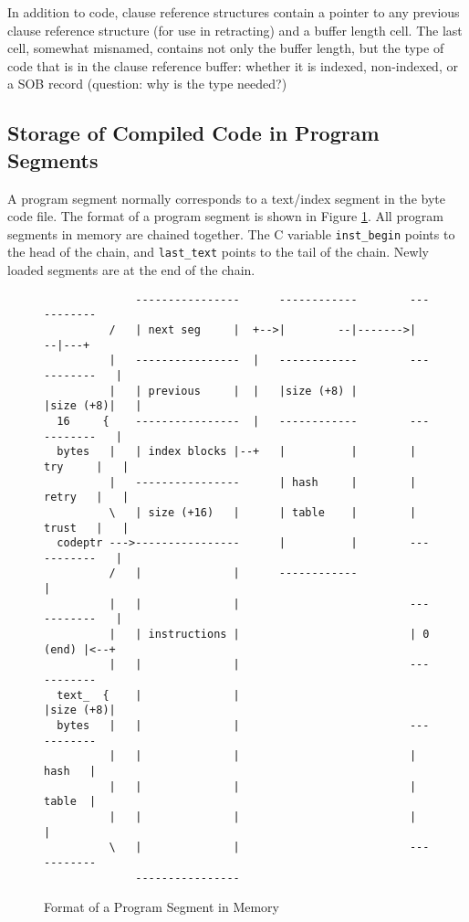 \documentclass[11pt]{article}
\begin{document}
In addition to code, clause reference structures contain a pointer to
any previous clause reference structure (for use in retracting) and a
buffer length cell.  The last cell, somewhat misnamed, contains not
only the buffer length, but the type of code that is in the clause
reference buffer: whether it is indexed, non-indexed, or a SOB record
(question: why is the type needed?)

\subsection{Storage of Compiled Code in Program Segments}

A program segment normally corresponds to a text/index segment in the 
byte code file.
The format of a program segment is shown in Figure \ref{f:programseg}.
All program segments in memory are chained together. The C variable
{\tt inst\_begin} points to the head of the chain, and 
{\tt last\_text} points to the tail of the chain. Newly loaded
segments are at the end of the chain.

\begin{figure}
\begin{verbatim}
              ----------------      ------------        -----------
          /   | next seg     |  +-->|        --|------->|       --|---+
          |   ----------------  |   ------------        -----------   |
          |   | previous     |  |   |size (+8) |        |size (+8)|   |
  16     {    ----------------  |   ------------        -----------   |
  bytes   |   | index blocks |--+   |          |        | try     |   |
          |   ----------------      | hash     |        | retry   |   |
          \   | size (+16)   |      | table    |        | trust   |   |
  codeptr --->----------------      |          |        -----------   |
          /   |              |      ------------                      |
          |   |              |                          -----------   |
          |   | instructions |                          | 0 (end) |<--+
          |   |              |                          -----------
  text_  {    |              |                          |size (+8)|
  bytes   |   |              |                          -----------
          |   |              |                          |  hash   |
          |   |              |                          |  table  |
          |   |              |                          |         |
          \   |              |                          -----------
              ----------------
\end{verbatim}
\caption{Format of a Program Segment in Memory}
\label{f:programseg}
\end{figure}
\end{document}
